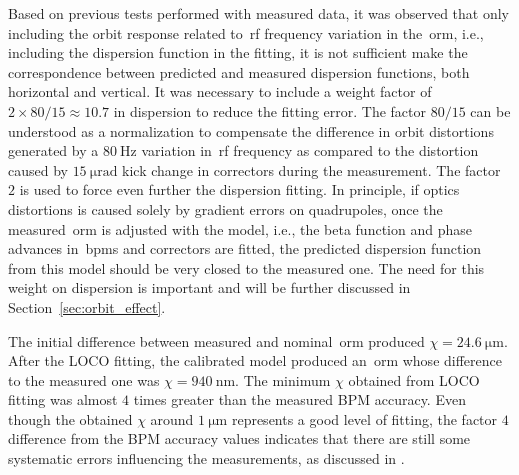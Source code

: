 Based on previous tests performed with measured data, it was observed that only including the orbit response related to~\gls{rf} frequency variation in the~\gls{orm}, i.e., including the dispersion function in the fitting, it is not sufficient make the correspondence between predicted and measured dispersion functions, both horizontal and vertical. It was necessary to include a weight factor of $2 \times 80/15 \approx 10.7$ in dispersion to reduce the fitting error. The factor $80/15$ can be understood as a normalization to compensate the difference in orbit distortions generated by a $\SI{80}{\hertz}$ variation in~\gls{rf} frequency as compared to the distortion caused by $\SI{15}{\micro\radian}$ kick change in correctors during the measurement. The factor $2$ is used to force even further the dispersion fitting. In principle, if optics distortions is caused solely by gradient errors on quadrupoles, once the measured~\gls{orm} is adjusted with the model, i.e., the beta function and phase advances in~\glspl{bpm} and correctors are fitted, the predicted dispersion function from this model should be very closed to the measured one. The need for this weight on dispersion is important and will be further discussed in Section~\ref{sec:orbit_effect}.

The initial difference between measured and nominal~\gls{orm} produced $\chi = \SI{24.6}{\micro\meter}$. After the LOCO fitting, the calibrated model produced an~\gls{orm} whose difference to the measured one was $\chi = \SI{940}{\nano\meter}$. The minimum $\chi$ obtained from LOCO fitting was almost $4$ times greater than the measured BPM accuracy. Even though the obtained $\chi$ around $\SI{1}{\micro\meter}$ represents a good level of fitting, the factor $4$ difference from the BPM accuracy values indicates that there are still some systematic errors influencing the measurements, as discussed in \cite{safranek1995}.


